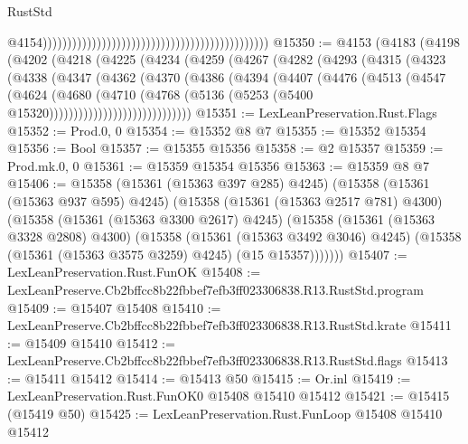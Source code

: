 \begin{lexlean}{RustStd}
\begin{coremodule}
                                                                                                @4154))))))))))))))))))))))))))))))))))))))))))))))
@15350 := @4153
    (@4183
      (@4198
        (@4202
          (@4218
            (@4225
              (@4234
                (@4259
                  (@4267
                    (@4282
                      (@4293
                        (@4315
                          (@4323
                            (@4338
                              (@4347
                                (@4362
                                  (@4370
                                    (@4386
                                      (@4394
                                        (@4407
                                          (@4476
                                            (@4513
                                              (@4547
                                                (@4624
                                                  (@4680
                                                    (@4710
                                                      (@4768
                                                        (@5136
                                                          (@5253
                                                            (@5400
                                                              @15320)))))))))))))))))))))))))))))
@15351 := LexLeanPreservation.Rust.Flags
@15352 := Prod.{0, 0}
@15354 := @15352 @8 @7
@15355 := @15352 @15354
@15356 := Bool
@15357 := @15355 @15356
@15358 := @2 @15357
@15359 := Prod.mk.{0, 0}
@15361 := @15359 @15354 @15356
@15363 := @15359 @8 @7
@15406 := @15358
    (@15361 (@15363 @397 @285) @4245)
    (@15358
      (@15361 (@15363 @937 @595) @4245)
      (@15358
        (@15361 (@15363 @2517 @781) @4300)
        (@15358
          (@15361 (@15363 @3300 @2617) @4245)
          (@15358
            (@15361 (@15363 @3328 @2808) @4300)
            (@15358
              (@15361 (@15363 @3492 @3046) @4245)
              (@15358 (@15361 (@15363 @3575 @3259) @4245) (@15 @15357)))))))
@15407 := LexLeanPreservation.Rust.FunOK
@15408 := LexLeanPreserve.Cb2bffcc8b22fbbef7efb3ff023306838.R13.RustStd.program
@15409 := @15407 @15408
@15410 := LexLeanPreserve.Cb2bffcc8b22fbbef7efb3ff023306838.R13.RustStd.krate
@15411 := @15409 @15410
@15412 := LexLeanPreserve.Cb2bffcc8b22fbbef7efb3ff023306838.R13.RustStd.flags
@15413 := @15411 @15412
@15414 := @15413 @50
@15415 := Or.inl
@15419 := LexLeanPreservation.Rust.FunOK0 @15408 @15410 @15412
@15421 := @15415 (@15419 @50)
@15425 := LexLeanPreservation.Rust.FunLoop @15408 @15410 @15412

\end{coremodule}
\end{lexlean}
